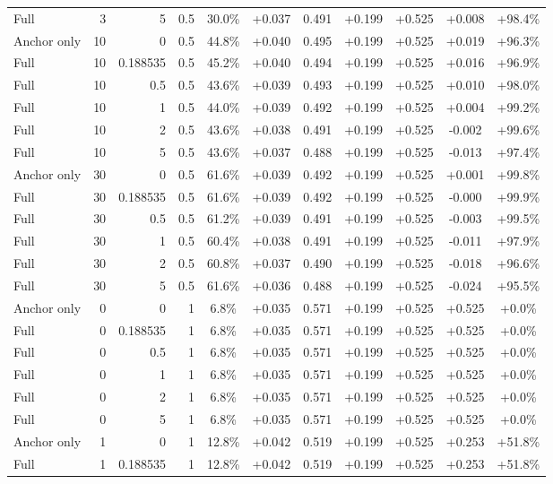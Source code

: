 \begin{table}[htbp]
\begin{tabular}{lrrrccccccc}
Full & 3 & 5 & 0.5 & 30.0\% & +0.037 & 0.491 & +0.199 & +0.525 & +0.008 & +98.4\% \\
Anchor only & 10 & 0 & 0.5 & 44.8\% & +0.040 & 0.495 & +0.199 & +0.525 & +0.019 & +96.3\% \\
Full & 10 & 0.188535 & 0.5 & 45.2\% & +0.040 & 0.494 & +0.199 & +0.525 & +0.016 & +96.9\% \\
Full & 10 & 0.5 & 0.5 & 43.6\% & +0.039 & 0.493 & +0.199 & +0.525 & +0.010 & +98.0\% \\
Full & 10 & 1 & 0.5 & 44.0\% & +0.039 & 0.492 & +0.199 & +0.525 & +0.004 & +99.2\% \\
Full & 10 & 2 & 0.5 & 43.6\% & +0.038 & 0.491 & +0.199 & +0.525 & -0.002 & +99.6\% \\
Full & 10 & 5 & 0.5 & 43.6\% & +0.037 & 0.488 & +0.199 & +0.525 & -0.013 & +97.4\% \\
Anchor only & 30 & 0 & 0.5 & 61.6\% & +0.039 & 0.492 & +0.199 & +0.525 & +0.001 & +99.8\% \\
Full & 30 & 0.188535 & 0.5 & 61.6\% & +0.039 & 0.492 & +0.199 & +0.525 & -0.000 & +99.9\% \\
Full & 30 & 0.5 & 0.5 & 61.2\% & +0.039 & 0.491 & +0.199 & +0.525 & -0.003 & +99.5\% \\
Full & 30 & 1 & 0.5 & 60.4\% & +0.038 & 0.491 & +0.199 & +0.525 & -0.011 & +97.9\% \\
Full & 30 & 2 & 0.5 & 60.8\% & +0.037 & 0.490 & +0.199 & +0.525 & -0.018 & +96.6\% \\
Full & 30 & 5 & 0.5 & 61.6\% & +0.036 & 0.488 & +0.199 & +0.525 & -0.024 & +95.5\% \\
Anchor only & 0 & 0 & 1 & 6.8\% & +0.035 & 0.571 & +0.199 & +0.525 & +0.525 & +0.0\% \\
Full & 0 & 0.188535 & 1 & 6.8\% & +0.035 & 0.571 & +0.199 & +0.525 & +0.525 & +0.0\% \\
Full & 0 & 0.5 & 1 & 6.8\% & +0.035 & 0.571 & +0.199 & +0.525 & +0.525 & +0.0\% \\
Full & 0 & 1 & 1 & 6.8\% & +0.035 & 0.571 & +0.199 & +0.525 & +0.525 & +0.0\% \\
Full & 0 & 2 & 1 & 6.8\% & +0.035 & 0.571 & +0.199 & +0.525 & +0.525 & +0.0\% \\
Full & 0 & 5 & 1 & 6.8\% & +0.035 & 0.571 & +0.199 & +0.525 & +0.525 & +0.0\% \\
Anchor only & 1 & 0 & 1 & 12.8\% & +0.042 & 0.519 & +0.199 & +0.525 & +0.253 & +51.8\% \\
Full & 1 & 0.188535 & 1 & 12.8\% & +0.042 & 0.519 & +0.199 & +0.525 & +0.253 & +51.8\% \\

\end{tabular}
\end{table}
